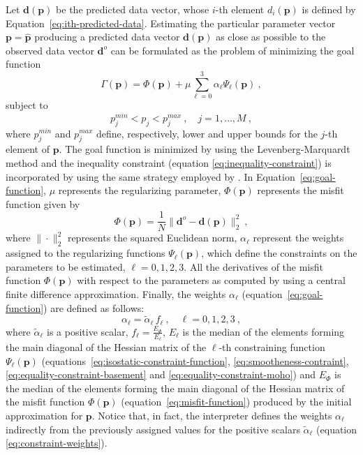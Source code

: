 \documentclass[manuscript]{geophysics}
\begin{document}
Let $\mathbf{d}(\mathbf{p})$ be the predicted data vector, whose $i$-th element
$d_{i}(\mathbf{p})$ is defined by Equation~\ref{eq:ith-predicted-data}. Estimating the
particular parameter vector $\mathbf{p} = \hat{\mathbf{p}}$ producing a predicted data
vector $\mathbf{d}(\mathbf{p})$ as close as possible to the observed data vector 
$\mathbf{d}^{o}$ can be formulated as the problem of minimizing the goal function
\begin{equation}
\Gamma (\mathbf{p}) = \Phi(\mathbf{p}) + \mu \sum_{\ell = 0}^{3} \alpha_{\ell}
\Psi_{\ell}(\mathbf{p}) \: ,
\label{eq:goal-function}
\end{equation}
subject to 
\begin{equation}
p_{j}^{min} < p_{j} < p_{j}^{max} \: , \quad j = 1, \dots, M \: ,
\label{eq:inequality-constraint}
\end{equation}
where $p_{j}^{min}$ and $p_{j}^{max}$ define, respectively, lower and upper bounds 
for the $j$-th element of $\mathbf{p}$.
The goal function is minimized by using the Levenberg-Marquardt method \citep{aster-etal2005}
and the inequality constraint (equation \ref{eq:inequality-constraint}) is
incorporated by using the same strategy employed by \citet{barbosa-etal1999}.
In Equation~\ref{eq:goal-function}, $\mu$ represents the regularizing parameter, 
$\Phi(\mathbf{p})$ represents the misfit function given by
\begin{equation}
\Phi(\mathbf{p}) = \frac{1}{N} \| \mathbf{d}^{o} - \mathbf{d}(\mathbf{p}) \|_{2}^{2} 
\: , 
\label{eq:misfit-function}
\end{equation}
where $\| \cdot \|_{2}^{2}$ represents the squared Euclidean norm, $\alpha_{\ell}$
represent the weights assigned to the regularizing functions $\Psi_{\ell}(\mathbf{p})$,
which define the constraints on the parameters to be estimated, $\ell = 0, 1, 2, 3$.
All the derivatives of the misfit function $\Phi(\mathbf{p})$ with respect to the parameters 
as computed by using a central finite difference approximation. Finally,
the weights $\alpha_{\ell}$ (equation~\ref{eq:goal-function}) are defined 
as follows:
\begin{equation}
\alpha_{\ell} = \tilde{\alpha}_{\ell} \, f_{\ell} \: , \quad \ell = 0, 1, 2, 3 \: ,
\label{eq:constraint-weights}
\end{equation}
where $\tilde{\alpha}_{\ell}$ is a positive scalar, $f_{\ell} = \frac{E_{\Phi}}{E_{\ell}}$, 
$E_{\ell}$ is the median of the elements forming the main diagonal of the Hessian matrix of the 
$\ell$-th constraining function $\Psi_{\ell}(\mathbf{p})$ 
(equations~\ref{eq:isostatic-constraint-function}, \ref{eq:smootheness-contraint},
\ref{eq:equality-constraint-basement} and \ref{eq:equality-constraint-moho})
and $E_{\Phi}$ is the median of the
elements forming the main diagonal of the Hessian matrix of the misfit function 
$\Phi(\mathbf{p})$ (equation~\ref{eq:misfit-function}) produced by the initial
approximation for $\mathbf{p}$.
Notice that, in fact, the interpreter defines the
weights $\alpha_{\ell}$ indirectly from the previously assigned values for the 
positive scalars $\tilde{\alpha}_{\ell}$ (equation \ref{eq:constraint-weights}).
\end{document}
